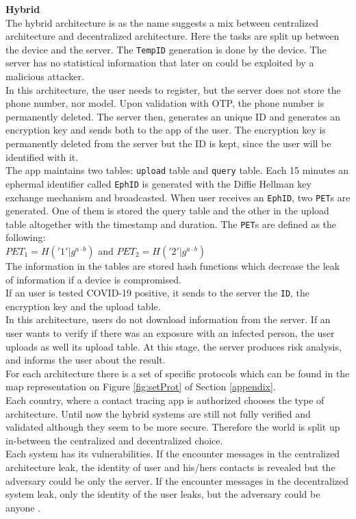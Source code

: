 \documentclass[a4paper, twocolumn]{article}
\begin{document}
\noindent \textbf{Hybrid}\\
The hybrid architecture is as the name suggests a mix between centralized architecture and decentralized architecture. Here the tasks are split up between the device and the server. The \texttt{TempID} generation is done by the device. The server has no statistical information that later on could be exploited by a malicious attacker.\\
In this architecture, the user needs to register, but the server does not store the phone number, nor model. Upon validation with OTP, the phone number is permanently deleted. The server then, generates an unique ID and generates an encryption key and sends both to the app of the user. The encryption key is permanently deleted from the server but the ID is kept, since the user will be identified with it.\\
The app maintains two tables: \texttt{upload} table and \texttt{query} table. Each 15 minutes an ephermal identifier called \texttt{EphID} is generated with the Diffie Hellman key exchange mechanism \cite{diffie} and broadcasted. When user receives an \texttt{EphID}, two \texttt{PET}s are generated. One of them is stored the query table and the other in the upload table altogether with the timestamp and duration. The \texttt{PET}s are defined as the following: \\
$PET_1 = H('1'|g^{a\cdot b})$ and $PET_2 = H('2'|g^{a\cdot b})$ \\
The information in the tables are stored hash functions which decrease the leak of information if a device is compromised.\\
If an user is tested COVID-19 positive, it sends to the server the \texttt{ID}, the encryption key and the upload table.\\
In this architecture, users do not download information from the server. If an user wants to verify if there was an exposure with an infected person, the user uploads as well its upload table. At this stage, the server produces risk analysis, and informs the user about the result.\\

\noindent For each architecture there is a set of specific protocols which can be found in the map representation on Figure \ref{fig:setProt} of Section \ref{appendix}.\\

\noindent Each country, where a contact tracing app is authorized chooses the type of architecture. Until now the hybrid systems are still not fully verified and validated although they seem to be more secure. Therefore the world is split up in-between the centralized and decentralized choice.\\
Each system has its vulnerabilities. If the encounter messages in the centralized architecture leak, the identity of user and his/hers contacts is revealed but the adversary could be only the server. If the encounter messages in the decentralized system leak, only the identity of the user leaks, but the adversary could be anyone \cite{orOr}.\\
\end{document}

